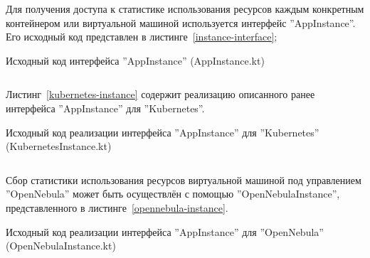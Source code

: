 Для получения доступа к статистике использования ресурсов каждым конкретным контейнером или виртуальной машиной используется интерфейс ''AppInstance''.
Его исходный код представлен в листинге~\ref{instance-interface};
\begin{longlisting}
    \caption{Исходный код интерфейса ''AppInstance'' (AppInstance.kt)}
    \label{instance-interface}
    \inputminted{kotlin}{code/AppInstance.kt}
\end{longlisting}

Листинг~\ref{kubernetes-instance} содержит реализацию описанного ранее интерфейса ''AppInstance'' для ''Kubernetes''.
\begin{longlisting}
    \caption{Исходный код реализации интерфейса ''AppInstance'' для ''Kubernetes'' (KubernetesInstance.kt)}
    \label{kubernetes-instance}
    \inputminted{kotlin}{code/KubernetesInstance.kt}
\end{longlisting}

Сбор статистики использования ресурсов виртуальной машиной под управлением ''OpenNebula'' может быть осуществлён с помощью ''OpenNebulaInstance'', представленного в листинге~\ref{opennebula-instance}.
\begin{longlisting}
    \caption{Исходный код реализации интерфейса ''AppInstance'' для ''OpenNebula'' (OpenNebulaInstance.kt)}
    \label{opennebula-instance}
    \inputminted{kotlin}{code/OpenNebulaInstance.kt}
\end{longlisting}
